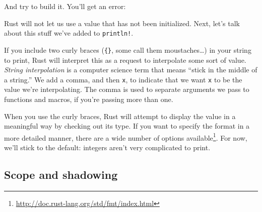 \documentclass[a4paper,]{book}
\newenvironment{Shaded}{\begin{snugshade}}{\end{snugshade}}
\newcommand{\KeywordTok}[1]{\textcolor[rgb]{0.13,0.29,0.53}{\textbf{{#1}}}}
\newcommand{\StringTok}[1]{\textcolor[rgb]{0.31,0.60,0.02}{{#1}}}
\newcommand{\NormalTok}[1]{{#1}}
\renewcommand{\href}[2]{#2\footnote{\url{#1}}}
\begin{document}
And try to build it. You'll get an error:

\begin{Shaded}
\end{Shaded}

Rust will not let us use a value that has not been initialized. Next,
let's talk about this stuff we've added to \texttt{println!}.

If you include two curly braces (\texttt{\{\}}, some call them
moustaches\ldots{}) in your string to print, Rust will interpret this as
a request to interpolate some sort of value. \emph{String interpolation}
is a computer science term that means ``stick in the middle of a
string.'' We add a comma, and then \texttt{x}, to indicate that we want
\texttt{x} to be the value we're interpolating. The comma is used to
separate arguments we pass to functions and macros, if you're passing
more than one.

When you use the curly braces, Rust will attempt to display the value in
a meaningful way by checking out its type. If you want to specify the
format in a more detailed manner, there are a
\href{http://doc.rust-lang.org/std/fmt/index.html}{wide number of
options available}. For now, we'll stick to the default: integers aren't
very complicated to print.

\subsection{Scope and shadowing}\label{scope-and-shadowing}
\end{document}
